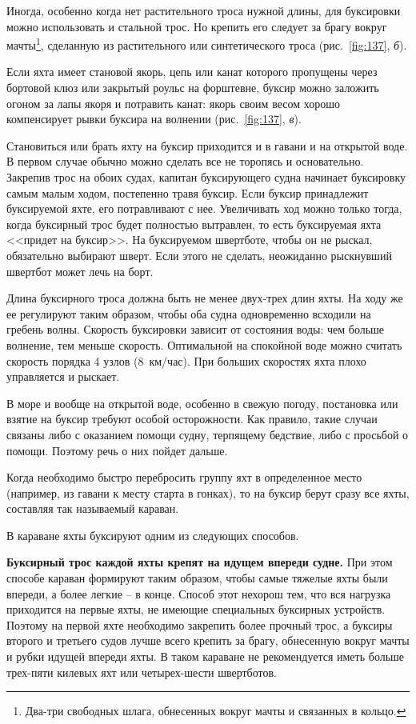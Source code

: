 \documentclass[a4paper, 12pt, twoside, final]{scrbook}
\begin{document}
Иногда, особенно когда нет растительного троса нужной длины, для буксировки можно использовать и стальной трос. Но крепить его следует за брагу вокруг мачты\footnote{Два-три свободных шлага, обнесенных вокруг мачты и связанных в кольцо.}, сделанную из растительного или синтетического троса (рис.~\ref{fig:137}, \textit{б}).

Если яхта имеет становой якорь, цепь или канат которого пропущены через бортовой клюз или закрытый роульс на форштевне, буксир можно заложить огоном за лапы якоря и потравить канат: якорь своим весом хорошо компенсирует рывки буксира на волнении (рис.~\ref{fig:137}, \textit{в}).

Становиться или брать яхту на буксир приходится и в гавани и на открытой воде. В первом случае обычно можно сделать все не торопясь и основательно. Закрепив трос на обоих судах, капитан буксирующего судна начинает буксировку самым малым ходом, постепенно травя буксир. Если буксир принадлежит буксируемой яхте, его потравливают с нее. Увеличивать ход можно только тогда, когда буксирный трос будет полностью вытравлен, то есть буксируемая яхта <<придет на буксир>>. На буксируемом швертботе, чтобы он не рыскал, обязательно выбирают шверт. Если этого не сделать, неожиданно рыскнувший швертбот может лечь на борт.

Длина буксирного троса должна быть не менее двух-трех длин яхты. На ходу же ее регулируют таким образом, чтобы оба судна одновременно всходили на гребень волны. Скорость буксировки зависит от состояния воды: чем больше волнение, тем меньше скорость. Оптимальной на спокойной воде можно считать скорость порядка 4 узлов (8~км/час). При больших скоростях яхта плохо управляется и рыскает.

В море и вообще на открытой воде, особенно в свежую погоду, постановка или взятие на буксир требуют особой осторожности. Как правило, такие случаи связаны либо с оказанием помощи судну, терпящему бедствие, либо с просьбой о помощи. Поэтому речь о них пойдет дальше.

Когда необходимо быстро перебросить группу яхт в определенное место (например, из гавани к месту старта в гонках), то на буксир берут сразу все яхты, составляя так называемый караван.

В караване яхты буксируют одним из следующих способов.

\textbf{Буксирный трос каждой яхты крепят на идущем впереди судне.} При этом способе караван формируют таким образом, чтобы самые тяжелые яхты были впереди, а более легкие \--- в конце. Способ этот нехорош тем, что вся нагрузка приходится на первые яхты, не имеющие специальных буксирных устройств. Поэтому на первой яхте необходимо закрепить более прочный трос, а буксиры второго и третьего судов лучше всего крепить за брагу, обнесенную вокруг мачты и рубки идущей впереди яхты. В таком караване не рекомендуется иметь больше трех\--пяти килевых яхт или четырех\--шести швертботов.
\end{document}
